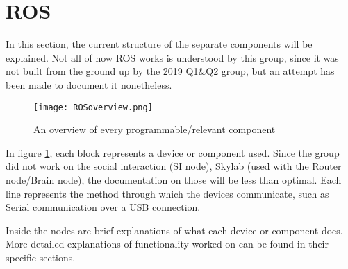 \section{ROS}

In this section, the current structure of the separate components will be explained.
Not all of how ROS works is understood by this group, since it was not built from the ground up by the 2019 Q1\&Q2 group, but an attempt has been made to document it nonetheless.

\begin{figure}[H]
\centering
\texttt{[image: ROSoverview.png]}
\caption{An overview of every programmable/relevant component}
\label{fig::ROSover}
\end{figure}

In figure \ref{fig::ROSover}, each block represents a device or component used.
Since the group did not work on the social interaction (SI node), Skylab (used with the Router node/Brain node), the documentation on those will be less than optimal.
Each line represents the method through which the devices communicate, such as Serial communication over a USB connection.

Inside the nodes are brief explanations of what each device or component does.
More detailed explanations of functionality worked on can be found in their specific sections.
\newpage